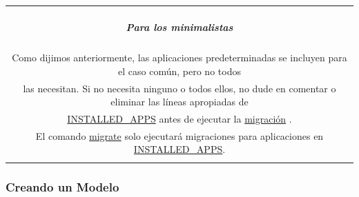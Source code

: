 \documentclass[10pt]{article}
\begin{document}
\begin{table}[H]
	\begin{tabular}{||c||}
	\hline \\
	\begin{Large}
	\textbf{\textit{Para los minimalistas}}
	\end{Large}
	\\\\		
Como dijimos anteriormente, las aplicaciones predeterminadas se incluyen para el caso común, pero no todos\\ las necesitan. Si no necesita ninguno o todos ellos, no dude en comentar o eliminar las líneas apropiadas de\\ {\href{https://docs.djangoproject.com/en/3.0/ref/settings/\#std:setting-INSTALLED\_APPS}{\textcolor{B}{INSTALLED\_APPS}}} antes de ejecutar la {\href{https://docs.djangoproject.com/en/3.0/ref/django-admin/\#django-admin-migrate}{\textcolor{B}{migración}}}
.\\ El comando {\href{https://docs.djangoproject.com/en/3.0/ref/django-admin/\#django-admin-migrate}{\textcolor{B}{migrate}}}
 solo ejecutará migraciones para aplicaciones en {\href{https://docs.djangoproject.com/en/3.0/ref/settings/\#std:setting-INSTALLED\_APPS}{\textcolor{B}{INSTALLED\_APPS}}}.
\\\\ \hline 	
			\end{tabular}
		\end{table}		

\subsubsection{Creando un Modelo}
\end{document}

